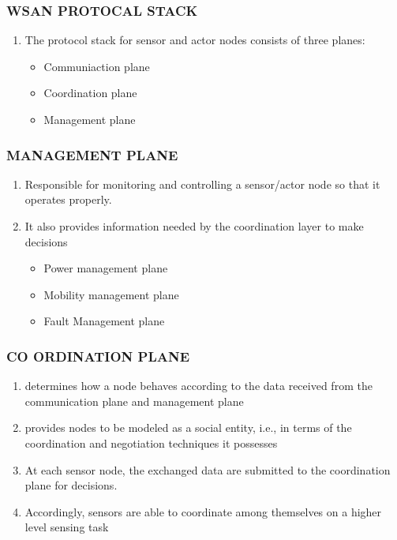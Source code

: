 \documentclass[11pt]{class}
\begin{document}
										\begin{frame}
											\frametitle{WSAN PROTOCAL STACK}
											\begin{enumerate}
												\item The protocol stack for sensor and actor nodes consists of three planes: 
												\begin{itemize}
													\item Communiaction plane 
													\item Coordination plane
													\item Management plane
												\end{itemize}
												 
											\end{enumerate}
										\end{frame}
											\begin{frame}
												\frametitle{MANAGEMENT PLANE}
												\begin{enumerate}
													\item Responsible for monitoring and controlling a sensor/actor node so that it operates properly.
													\item  It also provides information needed by the coordination layer to make decisions
													\begin{itemize}
														\item Power management plane 
														\item Mobility management plane
														\item Fault Management plane
													\end{itemize}
													
												\end{enumerate}
											\end{frame}
											\begin{frame}
												\frametitle{CO ORDINATION PLANE}
												\begin{enumerate}
													\item determines how a node behaves according to the data received from the communication plane and management plane
													\item provides nodes to be modeled as a social entity, i.e., in terms of the coordination and negotiation techniques it possesses
													\item At each sensor node, the exchanged data are submitted to the coordination plane for decisions.
													\item Accordingly, sensors are able to coordinate among themselves on a higher level sensing task
														
												\end{enumerate}
											\end{frame}
\end{document}
